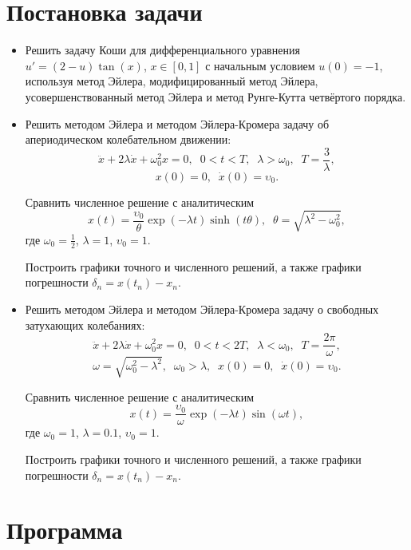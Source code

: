 \documentclass[
11pt,
master, %
subf, %
href, %
colorlinks=true, %
times, %
]{disser}
\begin{document}
\section{Постановка задачи}
\begin{itemize}
  \item Решить задачу Коши для дифференциального уравнения $u' = (2-u)\tan(x)$, $x\in [0,1]$ с начальным условием $u(0) = -1$, используя метод Эйлера, модифицированный метод Эйлера, усовершенствованный метод Эйлера и метод Рунге-Кутта четвёртого порядка.
  \item Решить методом Эйлера и методом Эйлера-Кромера задачу об апериодическом колебательном движении:
    $$\ddot{x} + 2\lambda \dot{x} + \omega_0^2 x = 0,\;\;0<t<T,\;\;\lambda > \omega_0,\;\; T = \frac{3}{\lambda},$$
    $$x(0) = 0,\;\; \dot{x}(0) = \upsilon_0.$$

    Сравнить численное решение с аналитическим
    $$x(t) = \frac{\upsilon_0}{\theta}\exp(-\lambda t)\sinh(t\theta),\;\;\theta = \sqrt{\lambda^2 - \omega_0^2},$$
    где $\omega_0 = \frac{1}{2}$, $\lambda = 1$, $\upsilon_0 = 1$.

    Построить графики точного и численного решений, а также графики погрешности $\delta_n = x(t_n) - x_n$.
  \item Решить методом Эйлера и методом Эйлера-Кромера задачу о свободных затухающих колебаниях:
    $$\ddot{x} + 2\lambda \dot{x} + \omega_0^2 x = 0,\;\;0<t<2T,\;\;\lambda < \omega_0,\;\; T = \frac{2\pi}{\omega},$$
  $$\omega = \sqrt{\omega_0^2 - \lambda^2},\;\;\omega_0 > \lambda,\;\;x(0) = 0,\;\; \dot{x}(0) = \upsilon_0.$$

  Сравнить численное решение с аналитическим
  $$x(t) = \frac{\upsilon_0}{\omega}\exp(-\lambda t)\sin(\omega t),$$
  где $\omega_0 = 1$, $\lambda = 0.1$, $\upsilon_0 = 1$.

  Построить графики точного и численного решений, а также графики погрешности $\delta_n = x(t_n) - x_n$.
\end{itemize}

\newpage
\section{Программа}
\end{document}
